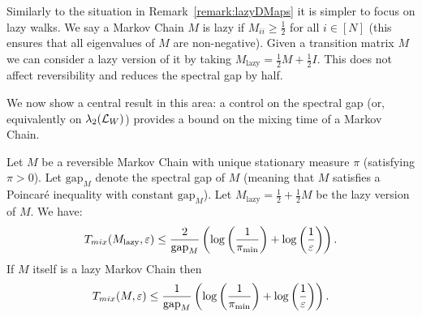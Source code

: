 Similarly to the situation in Remark~\ref{remark:lazyDMaps} it is simpler to focus on lazy walks. We say a Markov Chain $M$ is lazy if $M_{ii}\geq \frac12$ for all $i\in[N]$ (this ensures that all eigenvalues of $M$ are non-negative). Given a transition matrix $M$ we can consider a lazy version of it by taking $M_{\text{lazy}}=\frac12M+\frac12I$. This does not affect reversibility and reduces the spectral gap by half.

We now show a central result in this area: a control on the spectral gap (or, equivalently on $\lambda_2(\mathcal{L}_W)$) provides a bound on the mixing time of a Markov Chain.

\begin{theorem}\label{thm:spectralgapmixingtime}
 Let $M$ be a reversible Markov Chain with unique stationary measure $\pi$ (satisfying $\pi>0$). Let $\mathrm{gap}_M$ denote the spectral gap of $M$ (meaning that $M$ satisfies a Poincar\'e inequality with constant $\mathrm{gap}_M$). Let $M_{\text{lazy}}=\frac12+\frac12M$ be the lazy version of $M$. We have:
 \[
T_{mix}(M_{\text{lazy}},\varepsilon) \leq \frac2{\mathrm{gap}_M}
\left(
\log\left(\frac1{\pi_{\min}}\right)+\log\left(\frac1{\varepsilon}\right)
\right).
\]
If $M$ itself is a lazy Markov Chain then
 \[
T_{mix}(M,\varepsilon) \leq \frac1{\mathrm{gap}_M}
\left(
\log\left(\frac1{\pi_{\min}}\right)+\log\left(\frac1{\varepsilon}\right)
\right).
\]
\end{theorem}





